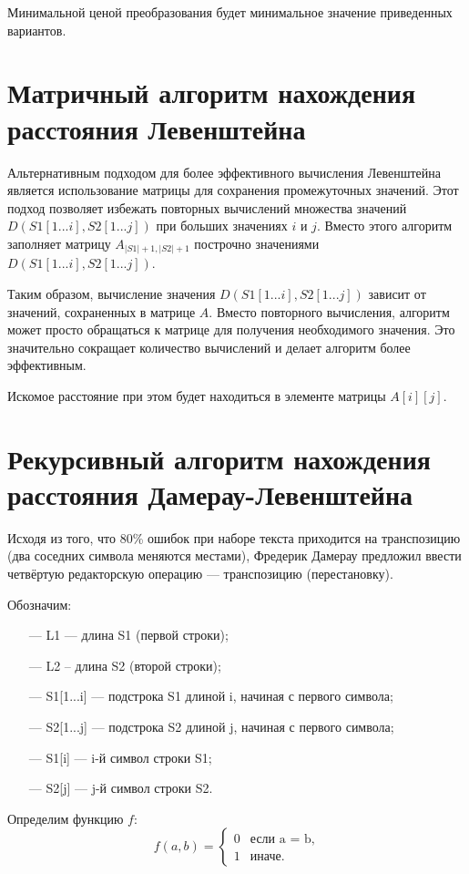 Минимальной ценой преобразования будет минимальное значение приведенных вариантов.

\section{Матричный алгоритм нахождения расстояния Левенштейна}

Альтернативным подходом для более эффективного вычисления Левенштейна является использование матрицы для сохранения промежуточных значений. Этот подход позволяет избежать повторных вычислений множества значений $D(S1[1...i], S2[1...j])$ при больших значениях $i$ и $j$. Вместо этого алгоритм заполняет матрицу $A_{|S1| + 1,|S2| + 1}$ построчно значениями $D(S1[1...i], S2[1...j])$.

Таким образом, вычисление значения $D(S1[1...i], S2[1...j])$ зависит от значений, сохраненных в матрице $A$. Вместо повторного вычисления, алгоритм может просто обращаться к матрице для получения необходимого значения. Это значительно сокращает количество вычислений и делает алгоритм более эффективным.

Искомое расстояние при этом будет находиться в элементе матрицы $A[i][j]$.

\section{Рекурсивный алгоритм нахождения расстояния Дамерау-Левенштейна}

Исходя из того, что 80\% ошибок при наборе текста приходится на транспозицию (два соседних символа меняются местами), Фредерик Дамерау предложил ввести четвёртую редакторскую операцию --- транспозицию (перестановку).

Обозначим:
\begin{itemize}
	\item[---] L1 --- длина S1 (первой строки);
	\item[---] L2 -- длина S2 (второй строки);
	\item[---] S1[1...i] --- подстрока S1 длиной i, начиная с первого символа;
	\item[---] S2[1...j] --- подстрока S2 длиной j, начиная с первого символа;
	\item[---] S1[i] --- i-й символ строки S1;
	\item[---] S2[j] --- j-й символ строки S2.
\end{itemize}

Определим функцию $f$:
\begin{equation}
	\label{eq:m}
	f(a, b) = \begin{cases}
		0 &\text{если a = b,}\\
		1 &\text{иначе}.
	\end{cases}
\end{equation}

